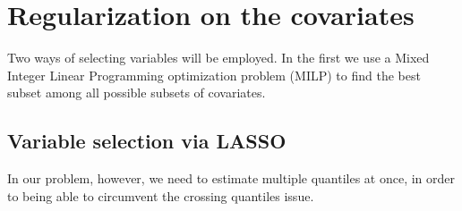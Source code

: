 \section{Regularization on the covariates} \label{sec:regularization}


Two ways of selecting variables will be employed. In the first we use a Mixed Integer Linear Programming optimization problem (MILP) to find the best subset among all possible subsets of covariates. 




\subsection{Variable selection via LASSO}
\label{sec:best-subset-ell1}

In our problem, however, we need to estimate multiple quantiles at once, in order to being able to circumvent the crossing quantiles issue. 

